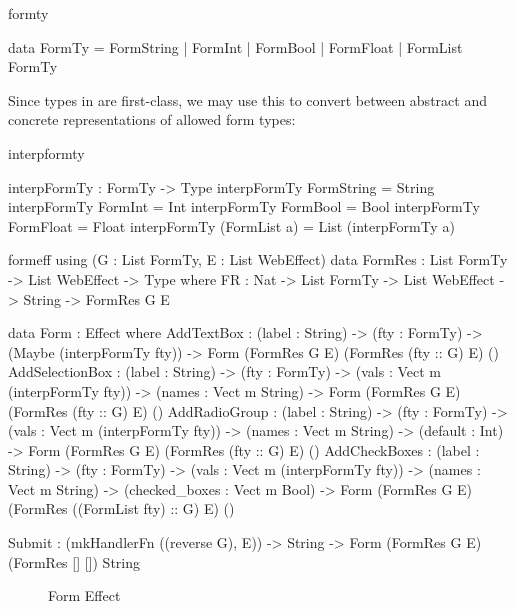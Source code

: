 \begin{SaveVerbatim}{formty}

data FormTy = FormString | FormInt
            | FormBool   | FormFloat
            | FormList FormTy 

\end{SaveVerbatim}

\noindent
Since types in \idris{} are first-class, we may use this to convert
between abstract and concrete representations of allowed form types:

\begin{SaveVerbatim}{interpformty}

interpFormTy : FormTy -> Type
interpFormTy FormString = String
interpFormTy FormInt = Int
interpFormTy FormBool = Bool
interpFormTy FormFloat = Float
interpFormTy (FormList a) = List (interpFormTy a)

\end{SaveVerbatim}

\begin{SaveVerbatim}{formeff}
using (G : List FormTy, E : List WebEffect)
  data FormRes : List FormTy -> List WebEffect -> Type where
    FR : Nat -> List FormTy -> List WebEffect -> String -> FormRes G E
  
  data Form : Effect where
    AddTextBox      : (label : String) -> (fty : FormTy) -> (Maybe (interpFormTy fty)) -> 
                      Form (FormRes G E) (FormRes (fty :: G) E) () 
    AddSelectionBox : (label : String) -> (fty : FormTy) -> (vals : Vect m (interpFormTy fty)) -> 
                      (names : Vect m String) ->
                      Form (FormRes G E)  (FormRes (fty :: G) E) ()
    AddRadioGroup   : (label : String) -> (fty : FormTy) -> (vals : Vect m (interpFormTy fty)) ->
                      (names : Vect m String) -> (default : Int) ->
                      Form (FormRes G E)  (FormRes (fty :: G) E) ()
    AddCheckBoxes   : (label : String) -> (fty : FormTy) -> (vals : Vect m (interpFormTy fty)) ->
                      (names : Vect m String) -> (checked_boxes : Vect m Bool) ->
                      Form (FormRes G E)  (FormRes ((FormList fty) :: G) E) ()

    Submit          : (mkHandlerFn ((reverse G), E)) -> String -> 
                      Form (FormRes G E)  (FormRes [] [])       String
\end{SaveVerbatim}

\begin{figure*}[t]
\begin{center}
\end{center}
\caption{Form Effect}
\label{fig:formeffect}
\end{figure*}

